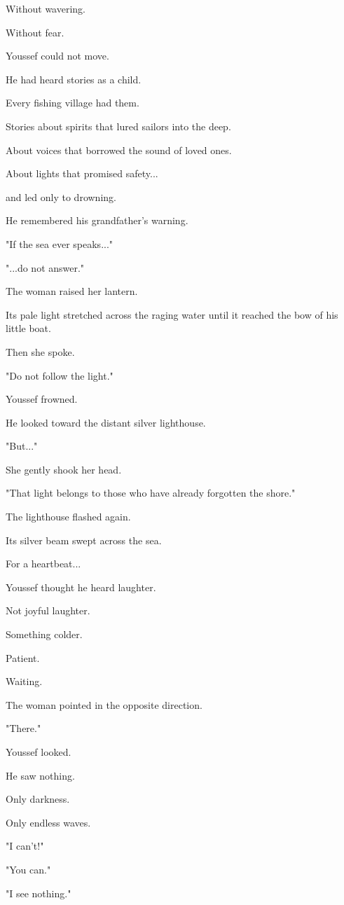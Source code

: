 \documentclass[12pt,openany]{book}
\begin{document}
Without wavering.

Without fear.

Youssef could not move.

He had heard stories as a child.

Every fishing village had them.

Stories about spirits that lured sailors into the deep.

About voices that borrowed the sound of loved ones.

About lights that promised safety...

and led only to drowning.

He remembered his grandfather's warning.

"If the sea ever speaks..."

"...do not answer."

The woman raised her lantern.

Its pale light stretched across the raging water until it reached the bow of his little boat.

Then she spoke.

"Do not follow the light."

Youssef frowned.

He looked toward the distant silver lighthouse.

"But..."

She gently shook her head.

"That light belongs to those who have already forgotten the shore."

The lighthouse flashed again.

Its silver beam swept across the sea.

For a heartbeat...

Youssef thought he heard laughter.

Not joyful laughter.

Something colder.

Patient.

Waiting.

The woman pointed in the opposite direction.

"There."

Youssef looked.

He saw nothing.

Only darkness.

Only endless waves.

"I can't!"

"You can."

"I see nothing."
\end{document}
